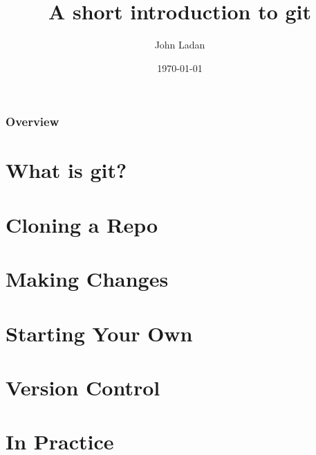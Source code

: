 \documentclass{beamer}
\title[git]{A short introduction to git}
\author{John Ladan}
\institute[Waterloo]{University of Waterloo\\john@ladan.ca}
\date{\today}
\begin{document}
\begin{frame}
    \titlepage
\end{frame}

\begin{frame}
    \frametitle{Overview}
    \tableofcontents
\end{frame}


\section{What is git?}


\section{Cloning a Repo}

\section{Making Changes}

\section{Starting Your Own}

\section{Version Control}

\section{In Practice}
\end{document}
